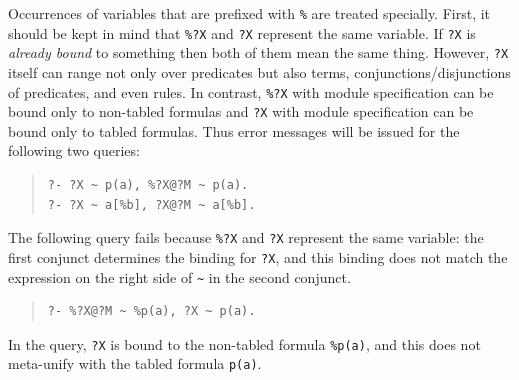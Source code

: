 \documentclass[11pt]{article}
\begin{document}
Occurrences of variables that are prefixed with {\tt \%} are treated
specially.  First, it should be kept in mind that {\tt \%?X} and {\tt ?X}
represent the same variable.  If {\tt ?X} is \emph{already bound} to
something then both of them mean the same thing.  However, {\tt ?X}
itself can range not only over predicates but also terms,
conjunctions/disjunctions of predicates, and even rules. In contrast,
{\tt \%?X} with module specification can be bound only to non-tabled
formulas and {\tt ?X} with module specification can be bound only to
tabled formulas.  Thus error messages
will be issued for the following two
queries:
\begin{quote}
\begin{verbatim}
?- ?X ~ p(a), %?X@?M ~ p(a).
?- ?X ~ a[%b], ?X@?M ~ a[%b].  
\end{verbatim}
\end{quote}
The following query fails because {\tt \%?X} and {\tt ?X} represent the
same variable: the first conjunct determines the binding for {\tt ?X},
and this binding does not match the expression on the right side of
\verb|~| in the second conjunct.
\begin{quote}
\begin{verbatim}
?- %?X@?M ~ %p(a), ?X ~ p(a).
\end{verbatim}
\end{quote}
In the query, {\tt ?X} is bound to the non-tabled formula {\tt \%p(a)},
and this does not meta-unify with the tabled formula {\tt p(a)}.
\end{document}
